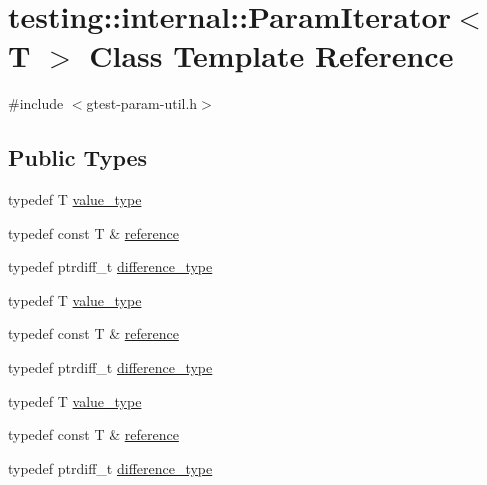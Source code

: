 \hypertarget{classtesting_1_1internal_1_1_param_iterator}{}\section{testing\+::internal\+::Param\+Iterator$<$ T $>$ Class Template Reference}
\label{classtesting_1_1internal_1_1_param_iterator}


{\ttfamily \#include $<$gtest-\/param-\/util.\+h$>$}

\subsection*{Public Types}
\begin{DoxyCompactItemize}
\item 
typedef T \mbox{\hyperlink{classtesting_1_1internal_1_1_param_iterator_a4afe3a68db0d0744753c8afe262e35df}{value\+\_\+type}}
\item 
typedef const T \& \mbox{\hyperlink{classtesting_1_1internal_1_1_param_iterator_ac96f133ffa06fc0f9faff5a1c7954382}{reference}}
\item 
typedef ptrdiff\+\_\+t \mbox{\hyperlink{classtesting_1_1internal_1_1_param_iterator_a6c37240a04ba3fc4c56f6c413cf4771d}{difference\+\_\+type}}
\item 
typedef T \mbox{\hyperlink{classtesting_1_1internal_1_1_param_iterator_a4afe3a68db0d0744753c8afe262e35df}{value\+\_\+type}}
\item 
typedef const T \& \mbox{\hyperlink{classtesting_1_1internal_1_1_param_iterator_ac96f133ffa06fc0f9faff5a1c7954382}{reference}}
\item 
typedef ptrdiff\+\_\+t \mbox{\hyperlink{classtesting_1_1internal_1_1_param_iterator_a6c37240a04ba3fc4c56f6c413cf4771d}{difference\+\_\+type}}
\item 
typedef T \mbox{\hyperlink{classtesting_1_1internal_1_1_param_iterator_a4afe3a68db0d0744753c8afe262e35df}{value\+\_\+type}}
\item 
typedef const T \& \mbox{\hyperlink{classtesting_1_1internal_1_1_param_iterator_ac96f133ffa06fc0f9faff5a1c7954382}{reference}}
\item 
typedef ptrdiff\+\_\+t \mbox{\hyperlink{classtesting_1_1internal_1_1_param_iterator_a6c37240a04ba3fc4c56f6c413cf4771d}{difference\+\_\+type}}
\end{DoxyCompactItemize}
